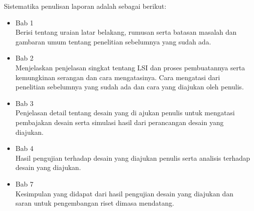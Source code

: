 Sistematika penulisan laporan adalah sebagai berikut:
\begin{itemize}
	\item Bab 1 \babSatu \\
	Berisi tentang uraian latar belakang, rumusan serta batasan masalah dan gambaran umum tentang penelitian sebelumnya yang sudah ada.
	\item Bab 2 \babDua \\
	Menjelaskan penjelasan singkat tentang LSI dan proses pembuatannya serta kemungkinan serangan dan cara mengatasinya. Cara mengatasi dari penelitian sebelumnya yang sudah ada dan cara yang diajukan oleh penulis.
	\item Bab 3 \babTiga \\
	Penjelasan detail tentang desain yang di ajukan penulis untuk mengatasi pembajakan desain serta simulasi hasil dari perancangan desain yang diajukan.
	\item Bab 4 \babEmpat \\
	Hasil pengujian terhadap desain yang diajukan penulis serta analisis terhadap desain yang diajukan.
	\item Bab 7 \kesimpulan \\
	Kesimpulan yang didapat dari hasil pengujian desain yang diajukan dan saran untuk pengembangan riset dimasa mendatang.
\end{itemize}